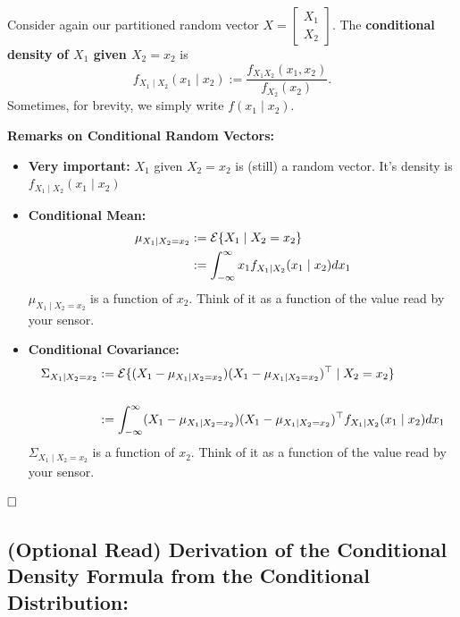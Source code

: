    \begin{definition} Consider again our partitioned random vector 
   $ X = \left[ \begin{array}{cc} X_1 \\ X_2 \end{array} \right]$. The \textbf{conditional density of $X_1$ given $X_2 = x_2$} is
          $$f_{X_1\mid X_2}(x_1 \mid x_2):=\frac{f_{X_1X_2}(x_1,x_2)}{f_{X_2}(x_2)}.$$
        Sometimes, for brevity, we simply write $f(x_1 \mid x_2)$.
 \end{definition} 
 
 \begin{rem} \textbf{Remarks on Conditional Random Vectors:}
        \begin{itemize}

        \item \textbf{Very important:} $X_1$ given $X_2=x_2$ is (still) a random vector. It's density is $f_{X_1\mid X_2}(x_1 \mid x_2)$

        \item \textbf{Conditional Mean:} \begin{align*} \mu_{X_1 \mid X_2=x_2}&:=\mathcal{E} \{ X_1 \mid X_2=x_2\}  \\ &:=\int_{-\infty}^{\infty} x_1 f_{X_1\mid X_2}(x_1 \mid x_2) dx_1
            \end{align*}
            $\mu_{X_1 \mid X_2=x_2}$ is a function of $x_2$. Think of it as a function of the value read by your sensor.

         \item  \textbf{Conditional Covariance:} \begin{align*} \Sigma_{X_1 \mid X_2=x_2} & := \mathcal{E} \{ (X_1 -\mu_{X_1 \mid X_2=x_2})(X_1 -\mu_{X_1 \mid X_2=x_2})^\top \mid X_2=x_2 \} \\ \\ &:=\int_{-\infty}^{\infty} (X_1 -\mu_{X_1 \mid X_2=x_2})(X_1 -\mu_{X_1 \mid X_2=x_2})^\top f_{X_1\mid X_2}(x_1 \mid x_2) dx_1
            \end{align*}
            $\Sigma_{X_1 \mid X_2=x_2}$ is a function of $x_2$. Think of it as a function of the value read by your sensor.

        \end{itemize}



 
 $\hfill \square$  \end{rem}
       


       \subsection{(Optional Read) Derivation of the Conditional Density Formula from the Conditional Distribution:}
       
